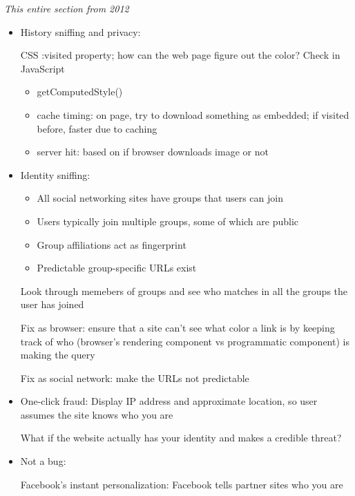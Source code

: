\textit{This entire section from 2012}
\begin{itemize}
    \item History sniffing and privacy:

        CSS :visited property; how can the web page figure out the color? Check
        in JavaScript
        \begin{itemize}
            \item getComputedStyle()
            \item cache timing: on page, try to download something as embedded;
                if visited before, faster due to caching
            \item server hit: based on if browser downloads image or not
        \end{itemize}
    \item Identity sniffing:
        \begin{itemize}
            \item All social networking sites have groups that users can join
            \item Users typically join multiple groups, some of which are public
            \item Group affiliations act as fingerprint
            \item Predictable group-specific URLs exist
        \end{itemize}
        Look through memebers of groups and see who matches in all the groups
        the user has joined

        Fix as browser: ensure that a site can't see what color a link is by
        keeping track of who (browser's rendering component vs programmatic
        component) is making the query

        Fix as social network: make the URLs not predictable
    \item One-click fraud: Display IP address and approximate location, so user
        assumes the site knows who you are

        What if the website actually has your identity and makes a credible
        threat?
    \item Not a bug:

        Facebook's instant personalization: Facebook tells partner sites who you
        are
\end{itemize}

